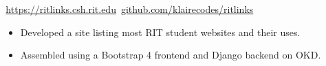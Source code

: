 \documentclass[11pt,letterpaper,ragged2e]{altacv}
\begin{document}
{
	{\faLink} \,\href{https://ritlinks.csh.rit.edu}{https://ritlinks.csh.rit.edu}\quad
	{\faGithub} \,\href{https://github.com/klairecodes/ritlinks}{github.com/klairecodes/ritlinks}
}
{
	\begin{itemize}
		\item Developed a site listing most RIT student websites and their uses.
		\item Assembled using a Bootstrap 4 frontend and Django backend on OKD.
	\end{itemize}
}
{
}


\clearpage

\nocite{*}
\end{document}

